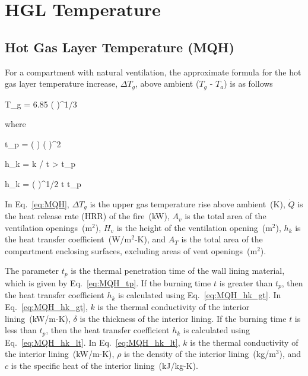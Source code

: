 \chapter{HGL Temperature}
\label{HGL:Chapter}

\section{Hot Gas Layer Temperature (MQH)}

For a compartment with natural ventilation, the approximate formula for the hot gas layer temperature increase, $\Delta T_g$, above ambient ($T_g$ - $T_a$) is as follows

\be
\Delta T_g = 6.85 \left(  \right)^{1/3}
\label{eq:MQH}
\ee

\noindent where

\be
t_p = \left(  \right) \left(  \right)^2
\label{eq:MQH_tp}
\ee

\be
h_k = k / \delta {} t > t_p
\label{eq:MQH_hk_gt}
\ee

\be
h_k = \left(  \right)^{1/2}  t \le t_p
\label{eq:MQH_hk_lt}
\ee

In Eq.~\ref{eq:MQH}, $\Delta T_g$ is the upper gas temperature rise above ambient~(K), $\dot Q$ is the heat release rate (HRR) of the fire~(kW), $A_v$ is the total area of the ventilation openings~(m$^2$), $H_v$ is the height of the ventilation opening~(m$^2$), $h_k$ is the heat transfer coefficient~(W/m$^2$-K), and $A_T$ is the total area of the compartment enclosing surfaces, excluding areas of vent openings~(m$^2$). 

The parameter $t_p$ is the thermal penetration time of the wall lining material, which is given by Eq.~\ref{eq:MQH_tp}. If the burning time $t$ is greater than $t_p$, then the heat transfer coefficient $h_k$ is calculated using Eq.~\ref{eq:MQH_hk_gt}. In Eq.~\ref{eq:MQH_hk_gt}, $k$ is the thermal conductivity of the interior lining~(kW/m-K), $\delta$ is the thickness of the interior lining. If the burning time $t$ is less than $t_p$, then the heat transfer coefficient $h_k$ is calculated using Eq.~\ref{eq:MQH_hk_lt}. In Eq.~\ref{eq:MQH_hk_lt}, $k$ is the thermal conductivity of the interior lining~(kW/m-K), $\rho$ is the density of the interior lining~(kg/m$^3$), and $c$ is the specific heat of the interior lining~(kJ/kg-K).

%
%
%
%

